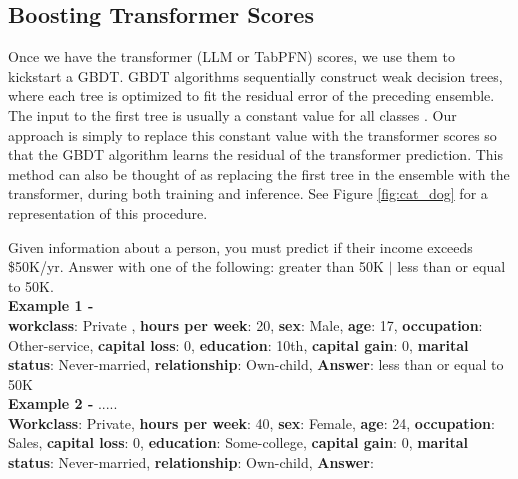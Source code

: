 \subsection{Boosting Transformer Scores}
Once we have the transformer (LLM or TabPFN) scores, we use them to kickstart a GBDT. GBDT algorithms sequentially construct weak decision trees, where each tree is optimized to fit the residual error of the preceding ensemble. The input to the first tree is usually a constant value for all classes \citep{chen2016xgboost}. Our approach is simply to replace this constant value with the transformer scores so that the GBDT algorithm learns the residual of the transformer prediction. This method can also be thought of as replacing the first tree in the ensemble with the transformer, during both training and inference. See Figure \ref{fig:cat_dog} for a representation of this procedure.

\begin{tcolorbox}[colback=gray!10!white, colframe=black, title=Example prompt for the adult income dataset]
 
Given information about a person, you must predict if their income exceeds \$50K/yr. Answer with one of the following: 
greater than 50K $\vert$ less than or equal to 50K.\\

\textbf{Example 1 -} \\
\textbf{workclass}: Private , \textbf{hours per week}: 20, \textbf{sex}: Male, \textbf{age}: 17, \textbf{occupation}: Other-service, \textbf{capital loss}: 0, \textbf{education}: 10th, \textbf{capital gain}: 0, \textbf{marital status}: Never-married, \textbf{relationship}: Own-child, \textbf{Answer}: less than or equal to 50K \\

\textbf{Example 2 -} ..... \\

\textbf{Workclass}: Private, \textbf{hours per week}: 40, \textbf{sex}: Female, \textbf{age}: 24, \textbf{occupation}: Sales, \textbf{capital loss}: 0, \textbf{education}: Some-college, \textbf{capital gain}: 0, \textbf{marital status}: Never-married, \textbf{relationship}: Own-child, \textbf{Answer}:
\end{tcolorbox}

\noindent\begin{minipage}{\textwidth}
\label{example_prompt}
\end{minipage}

